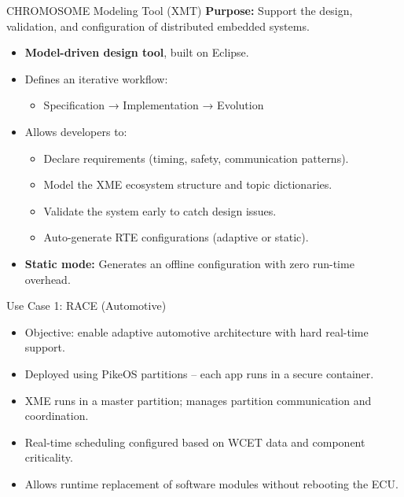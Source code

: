 \documentclass{beamer}
\begin{document}
\begin{frame}{CHROMOSOME Modeling Tool (XMT)}
  \textbf{Purpose:} Support the design, validation, and configuration of distributed embedded systems.

  \vspace{0.7em}
  \begin{itemize}
    \item \textbf{Model-driven design tool}, built on Eclipse.
    \item Defines an iterative workflow:
    \begin{itemize}
      \item Specification → Implementation → Evolution
    \end{itemize}
    \item Allows developers to:
    \begin{itemize}
      \item Declare requirements (timing, safety, communication patterns).
      \item Model the XME ecosystem structure and topic dictionaries.
      \item Validate the system early to catch design issues.
      \item Auto-generate RTE configurations (adaptive or static).
    \end{itemize}
    \item \textbf{Static mode:} Generates an offline configuration with zero run-time overhead.
  \end{itemize}
\end{frame}

\begin{frame}{Use Case 1: RACE (Automotive)}
  \begin{itemize}
    \item Objective: enable adaptive automotive architecture with hard real-time support.
    \item Deployed using PikeOS partitions -- each app runs in a secure container.
    \item XME runs in a master partition; manages partition communication and coordination.
    \item Real-time scheduling configured based on WCET data and component criticality.
    \item Allows runtime replacement of software modules without rebooting the ECU.
  \end{itemize}
\end{frame}
\end{document}

